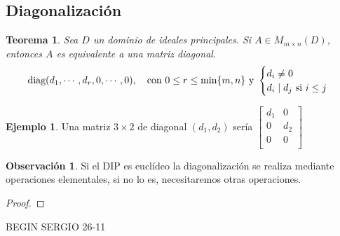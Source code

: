 \documentclass{article}
\theoremstyle{theorem-style}  %
\newtheorem{theorem}{Teorema}[section]  %
\theoremstyle{definition}
\newtheorem*{observation}{Observación} %
\theoremstyle{example-style}
\newtheorem{example}{Ejemplo}[section]
\begin{document}
	\subsection{Diagonalización}
	\begin{theorem}
		Sea $ D $ un dominio de ideales principales. Si $ A \in M_{m\times n}(D) $, entonces $ A $ es equivalente a una matriz diagonal.
		\[ \text{diag}(d_1, \cdots, d_r, 0, \cdots, 0), \quad \text{con } 0\leq r \leq \min \{m,n\} \text{ y }\begin{cases}
			d_i\neq 0\\
			d_i \mid d_j $ si $ i\leq j
		\end{cases}\]
		
		
	\end{theorem}
	\begin{example}
		Una matriz $3\times 2$ de diagonal $(d_1,d_2)$ sería $\begin{bmatrix}
		d_1 & 0  \\
		0   & d_2\\
		0   & 0  \\
		\end{bmatrix}$
	\end{example}
	\begin{observation}
		Si el DIP es euclídeo la diagonalización se realiza mediante operaciones elementales, si no lo es, necesitaremos otras operaciones.
	\end{observation}
	\begin{proof}
		
	\end{proof}

	BEGIN SERGIO 26-11
	
\end{document}
